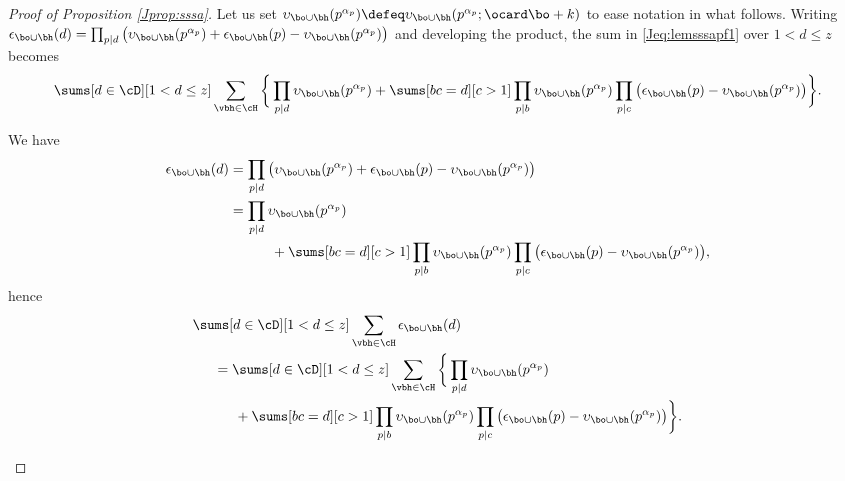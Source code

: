\documentclass[12pt, reqno, twoside, letterpaper]{amsart}
\begin{document}
\begin{jetsam}
\begin{proof}[Proof of Proposition \ref{Jprop:sssa}]
Let us set   
$
 \upsilon_{\bo \cup \bh}(p^{\alpha_p}) 
  \defeq \upsilon_{\bo \cup \bh}(p^{\alpha_p}; \ocard \bo + k)
$
to ease notation in what follows.
%
Writing
$
 \epsilon_{\bo \cup \bh}(d)
  =
   \prod_{p \mid d}\big(\upsilon_{\bo \cup \bh}(p^{\alpha_p}) + \epsilon_{\bo \cup \bh}(p) - \upsilon_{\bo \cup \bh}(p^{\alpha_p})\big)
$
and developing the product, the sum in \eqref{Jeq:lemsssapf1} over 
$1 < d \le z$ becomes 
\[
 \sums[d \in \cD][1 < d \le z] 
  \sum_{\vbh \in \cH}
   \bigg\{ 
    \prod_{p \mid d} \upsilon_{\bo \cup \bh}(p^{\alpha_p})
    + 
      \sums[bc = d][c > 1] 
       \prod_{p \mid b} \upsilon_{\bo \cup \bh}(p^{\alpha_p})
        \prod_{p \mid c} \big(\epsilon_{\bo \cup \bh}(p) - \upsilon_{\bo \cup \bh}(p^{\alpha_p})\big)
  \bigg\}.
\]
%
%
\begin{nixnix}
%
We have 
\begin{align*}
 \epsilon_{\bo \cup \bh}(d)
 & =
   \prod_{p \mid d}\big(\upsilon_{\bo \cup \bh}(p^{\alpha_p}) + \epsilon_{\bo \cup \bh}(p) - \upsilon_{\bo \cup \bh}(p^{\alpha_p})\big)
 \\
 & =
     \prod_{p \mid d} \upsilon_{\bo \cup \bh}(p^{\alpha_p})
 \\
 & \hspace{30pt} + 
       \sums[bc = d][c > 1] 
        \prod_{p \mid b} \upsilon_{\bo \cup \bh}(p^{\alpha_p})
         \prod_{p \mid c} \big(\epsilon_{\bo \cup \bh}(p) - \upsilon_{\bo \cup \bh}(p^{\alpha_p})\big), 
\end{align*}
hence 
\begin{align*}
 & 
 \sums[d \in \cD][1 < d \le z] 
  \sum_{\vbh \in \cH}
   \epsilon_{\bo \cup \bh}(d)
 \\
 & \hspace{15pt} 
   =
     \sums[d \in \cD][1 < d \le z] 
      \sum_{\vbh \in \cH}
       \bigg\{ 
        \prod_{p \mid d} \upsilon_{\bo \cup \bh}(p^{\alpha_p})
 \\
 & \hspace{30pt} + 
          \sums[bc = d][c > 1] 
           \prod_{p \mid b} \upsilon_{\bo \cup \bh}(p^{\alpha_p})
            \prod_{p \mid c} \big(\epsilon_{\bo \cup \bh}(p) - \upsilon_{\bo \cup \bh}(p^{\alpha_p})\big)
      \bigg\}.
\end{align*}
%
\end{nixnix}
%

\end{proof}
\end{jetsam}
\end{document}
